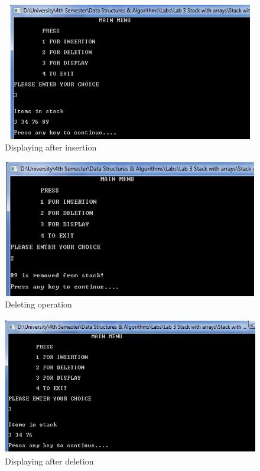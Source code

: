 \documentclass[11pt]{article}            %
\begin{document}
\begin{figure}[H]
\centering
  \includegraphics[width=12cm,height=6cm,keepaspectratio]{2.png}
\caption{Displaying after insertion}
\label{Figure:4}    
\end{figure}

\begin{figure}[H]
\centering
  \includegraphics[width=12cm,height=6cm,keepaspectratio]{3.png}
\caption{Deleting operation}
\label{Figure:5}    
\end{figure}

\begin{figure}[H]
\centering
  \includegraphics[width=12cm,height=6cm,keepaspectratio]{4.png}
\caption{Displaying after deletion}
\label{Figure:6}    
\end{figure}
\end{document}
